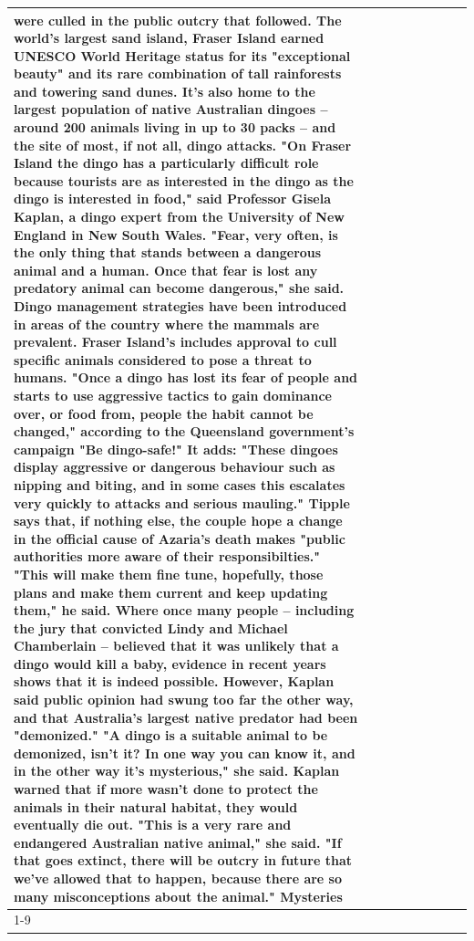 \begin{table}[H]
\begin{tabular}{lllrlllll}
were culled in the public outcry that followed. The world's largest sand island, Fraser Island earned UNESCO World Heritage status for its "exceptional beauty" and its rare combination of tall rainforests and towering sand dunes. It's also home to the largest population of native Australian dingoes -- around 200 animals living in up to 30 packs -- and the site of most, if not all, dingo attacks. "On Fraser Island the dingo has a particularly difficult role because tourists are as interested in the dingo as the dingo is interested in food," said Professor Gisela Kaplan, a dingo expert from the University of New England in New South Wales. "Fear, very often, is the only thing that stands between a dangerous animal and a human. Once that fear is lost any predatory animal can become dangerous," she said. Dingo management strategies have been introduced in areas of the country where the mammals are prevalent. Fraser Island's includes approval to cull specific animals considered to pose a threat to humans. "Once a dingo has lost its fear of people and starts to use aggressive tactics to gain dominance over, or food from, people the habit cannot be changed," according to the Queensland government's campaign "Be dingo-safe!" It adds: "These dingoes display aggressive or dangerous behaviour such as nipping and biting, and in some cases this escalates very quickly to attacks and serious mauling." Tipple says that, if nothing else, the couple hope a change in the official cause of Azaria's death makes "public authorities more aware of their responsibilties." "This will make them fine tune, hopefully, those plans and make them current and keep updating them," he said. Where once many people -- including the jury that convicted Lindy and Michael Chamberlain -- believed that it was unlikely that a dingo would kill a baby, evidence in recent years shows that it is indeed possible. However, Kaplan said public opinion had swung too far the other way, and that Australia's largest native predator had been "demonized." "A dingo is a suitable animal to be demonized, isn't it? In one way you can know it, and in the other way it's mysterious," she said. Kaplan warned that if more wasn't done to protect the animals in their natural habitat, they would eventually die out. "This is a very rare and endangered Australian native animal," she said. "If that goes extinct, there will be outcry in future that we've allowed that to happen, because there are so many misconceptions about the animal." Mysteries \\
\cline{1-9}

\end{tabular}
\end{table}
